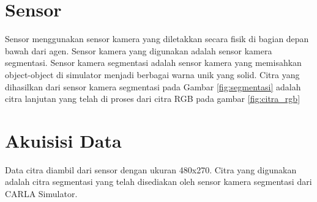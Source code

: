 \section{Sensor}
\label{sec:sensor}
Sensor menggunakan sensor kamera yang diletakkan secara fisik di bagian depan bawah dari agen. Sensor kamera yang digunakan adalah sensor kamera segmentasi. Sensor kamera segmentasi adalah sensor kamera yang memisahkan object-object di simulator menjadi berbagai warna unik yang solid. Citra yang dihasilkan dari sensor kamera segmentasi pada Gambar \ref{fig:segmentasi} adalah citra lanjutan yang telah di proses dari citra RGB pada gambar \ref{fig:citra_rgb}


\section{Akuisisi Data}
\label{sec:akuisisi_data}
Data citra diambil dari sensor dengan ukuran 480x270. Citra yang digunakan adalah citra segmentasi yang telah disediakan oleh sensor kamera segmentasi dari CARLA Simulator.

